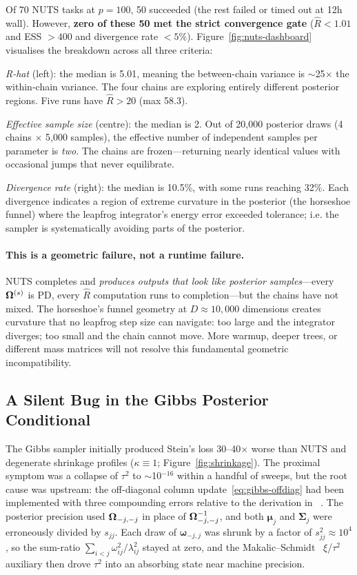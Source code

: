 \documentclass[10pt,conference,compsoc]{IEEEtran}
\begin{document}
Of 70 NUTS tasks at $p{=}100$, 50 succeeded (the rest failed or timed out at 12h wall). However, \textbf{zero of these 50 met the strict convergence gate} ($\hat{R} < 1.01$ and ESS $> 400$ and divergence rate $< 5\%$). Figure~\ref{fig:nuts-dashboard} visualises the breakdown across all three criteria:

\emph{R-hat} (left): the median is 5.01, meaning the between-chain variance is $\sim$25$\times$ the within-chain variance. The four chains are exploring entirely different posterior regions. Five runs have $\hat{R} > 20$ (max 58.3).

\emph{Effective sample size} (centre): the median is 2. Out of 20{,}000 posterior draws (4 chains $\times$ 5{,}000 samples), the effective number of independent samples per parameter is \emph{two}. The chains are frozen---returning nearly identical values with occasional jumps that never equilibrate.

\emph{Divergence rate} (right): the median is 10.5\%, with some runs reaching 32\%. Each divergence indicates a region of extreme curvature in the posterior (the horseshoe funnel) where the leapfrog integrator's energy error exceeded tolerance; i.e. the sampler is systematically avoiding parts of the posterior.

\paragraph{This is a geometric failure, not a runtime failure.} NUTS completes and \emph{produces outputs that look like posterior samples}---every $\bm{\Omega}^{(s)}$ is PD, every $\hat{R}$ computation runs to completion---but the chains have not mixed. The horseshoe's funnel geometry at $D \approx 10{,}000$ dimensions creates curvature that no leapfrog step size can navigate: too large and the integrator diverges; too small and the chain cannot move. More warmup, deeper trees, or different mass matrices will not resolve this fundamental geometric incompatibility.

\subsection{A Silent Bug in the Gibbs Posterior Conditional}
\label{sec:gibbs-bug}

The Gibbs sampler initially produced Stein's loss 30--40$\times$ worse than NUTS and degenerate shrinkage profiles ($\kappa \equiv 1$; Figure~\ref{fig:shrinkage}). The proximal symptom was a collapse of $\tau^2$ to $\sim$10$^{-16}$ within a handful of sweeps, but the root cause was upstream: the off-diagonal column update~\eqref{eq:gibbs-offdiag} had been implemented with three compounding errors relative to the derivation in ~\cite{li2019}. The posterior precision used $\bm{\Omega}_{-j,-j}$ in place of $\bm{\Omega}_{-j,-j}^{-1}$, and both $\bm{\mu}_j$ and $\bm{\Sigma}_j$ were erroneously divided by $s_{jj}$. Each draw of $\bm{\omega}_{-j,j}$ was shrunk by a factor of $s_{jj}^2\approx10^4$, so the sum-ratio $\sum_{i<j}\omega_{ij}^2/\lambda_{ij}^2$ stayed at zero, and the Makalic--Schmidt~\cite{makalic2016} $\xi$/$\tau^2$ auxiliary then drove $\tau^2$ into an absorbing state near machine precision.
\end{document}
